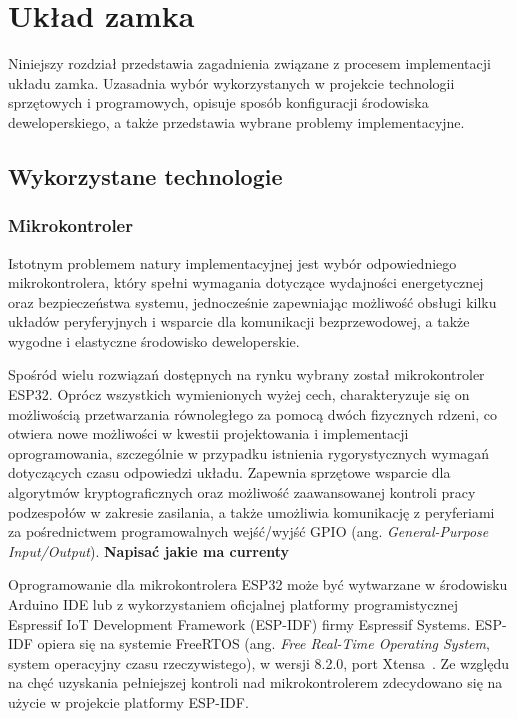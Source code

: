 \chapter{Układ zamka}
\label{chap:controller}

    Niniejszy rozdział przedstawia zagadnienia związane z procesem implementacji układu zamka. Uzasadnia wybór wykorzystanych w projekcie technologii sprzętowych i programowych, opisuje sposób konfiguracji środowiska deweloperskiego, a także przedstawia wybrane problemy implementacyjne.

    \section{Wykorzystane technologie}

        \subsection{Mikrokontroler}

            Istotnym problemem natury implementacyjnej jest wybór odpowiedniego mikrokontrolera, który spełni wymagania dotyczące wydajności energetycznej oraz bezpieczeństwa systemu, jednocześnie zapewniając możliwość obsługi kilku układów peryferyjnych i wsparcie dla komunikacji bezprzewodowej, a także wygodne i elastyczne środowisko deweloperskie.

            Spośród wielu rozwiązań dostępnych na rynku wybrany został mikrokontroler ESP32. Oprócz wszystkich wymienionych wyżej cech, charakteryzuje się on możliwością przetwarzania równoległego za pomocą dwóch fizycznych rdzeni, co otwiera nowe możliwości w kwestii projektowania i implementacji oprogramowania, szczególnie w przypadku istnienia rygorystycznych wymagań dotyczących czasu odpowiedzi układu. Zapewnia sprzętowe wsparcie dla algorytmów kryptograficznych oraz możliwość zaawansowanej kontroli pracy podzespołów w zakresie zasilania, a także umożliwia komunikację z peryferiami za pośrednictwem programowalnych wejść/wyjść GPIO (ang. \textit{General-Purpose Input/Output}). \textbf{Napisać jakie ma currenty}

            Oprogramowanie dla mikrokontrolera ESP32 może być wytwarzane w środowisku Arduino IDE lub z wykorzystaniem oficjalnej platformy programistycznej Espressif IoT Development Framework (ESP-IDF) firmy Espressif Systems. ESP-IDF opiera się na systemie FreeRTOS (ang. \textit{Free Real-Time Operating System}, system operacyjny czasu rzeczywistego), w wersji 8.2.0, port Xtensa~\cite{esp-idf-freertos-smp-changes}. Ze względu na chęć uzyskania pełniejszej kontroli nad mikrokontrolerem zdecydowano się na użycie w projekcie platformy ESP-IDF.


